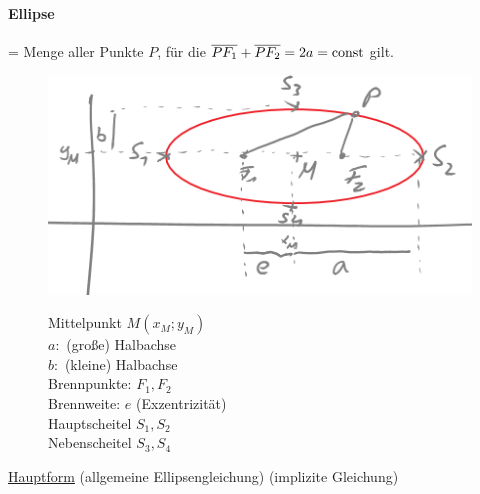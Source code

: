 \begin{enumerate}[A)]
	\paragraph{Ellipse}= Menge aller Punkte $P$, für die $\overline{PF_1}+\overline{PF_2}= 2a=\text{const}$ gilt.
	\begin{figure}[h!]
		\begin{minipage}{8cm}
			\includegraphics[width=\linewidth]{Bilder/123}
			\caption{}
		\end{minipage}
		\quad
		\begin{minipage}{\linewidth-8cm - 1em}
			Mittelpunkt $M(x_M;y_M)$\\
			$a:$ (große) Halbachse\\
			$b:$ (kleine) Halbachse\\
			Brennpunkte: $F_1,F_2$\\
			Brennweite: $e$ (Exzentrizität)\\
			Hauptscheitel $S_1,S_2$\\
			Nebenscheitel $S_3,S_4$
		\end{minipage}
	\end{figure}
	
	
	\ul{Hauptform} (allgemeine Ellipsengleichung)
	 (implizite Gleichung)
	

\end{enumerate}
